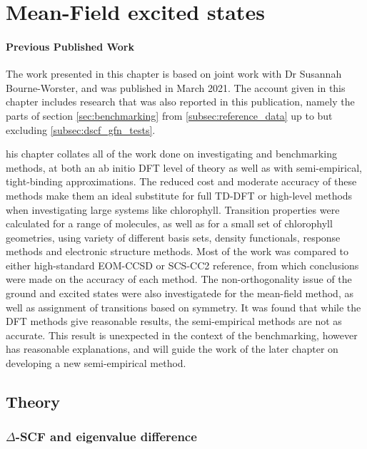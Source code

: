 %
%
\chapter{Mean-Field excited states}
\label{chap:dscf}

\subsubsection*{Previous Published Work}
The work presented in this chapter is based on joint work with Dr Susannah Bourne-Worster,
and was published in March 2021\cite{Worster2021}. The account given in this 
chapter includes research that was also reported in this publication, namely the
parts of section \ref{sec:benchmarking} from \ref{subsec:reference_data} up to
but excluding \ref{subsec:dscf_gfn_tests}.

his chapter collates all of the work done on investigating and benchmarking
\dscf methods, at both an ab initio DFT level of theory as well as with semi-empirical, 
tight-binding approximations. The reduced cost and moderate accuracy of these methods
make them an ideal substitute for full TD-DFT or high-level methods when investigating
large systems like chlorophyll.
Transition properties were calculated for a range of molecules, as well as
for a small set of chlorophyll geometries, using variety of different basis sets,
density functionals, response methods and electronic structure methods. Most of 
the work was compared to either high-standard EOM-CCSD or SCS-CC2 reference, from
which conclusions were made on the accuracy of each method. The non-orthogonality 
issue of the ground and excited states were also investigatede for the mean-field 
\dscf method, as well as assignment of transitions based on symmetry. 
It was found that while the DFT methods give reasonable results, the semi-empirical
\dscf methods are not as accurate. This result is unexpected in the context of
the benchmarking, however has reasonable explanations, and will guide the work
of the later chapter on developing a new semi-empirical method.

\section{Theory}
\label{sec:dscf_theory}
\subsection{$\Delta$-SCF and eigenvalue difference}
\label{subsec{dscf_and_eigdiff}}

